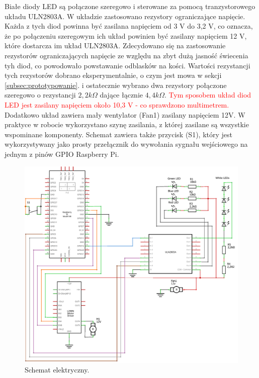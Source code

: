 Białe diody LED są połączone szeregowo i sterowane za pomocą tranzystorowego układu ULN2803A. W układzie zastosowano rezystory ograniczające napięcie. Każda z tych diod powinna być 
zasilana napięciem od 3 V do 3,2 V, co oznacza, że po połączeniu szeregowym ich układ powinien być zasilany napięciem 12 V, które dostarcza im układ ULN2803A. Zdecydowano się na zastosowanie
rezystorów ograniczających napięcie ze względu na zbyt dużą jasność świecenia tyh diod, co powodowało powstawanie odblasków na kości. Wartości rezystancji tych rezystorów dobrano eksperymentalnie, o czym jest mowa w sekcji \ref{subsec:prototypowanie}.
i ostatecznie wybrano dwa rezystory połączone szeregowo o rezystancji $2{,}2 k\Omega$ dające łącznie $4{,}4 k\Omega$. \textcolor{red}{Tym sposobem układ diod LED jest zasilany napięciem około 10,3 V - co sprawdzono multimetrem.}
Dodatkowo układ zawiera mały wentylator (Fan1) zasilany napięciem 12V. W praktyce w robocie wykorzystano szynę zasilania, z której zasilane są wszystkie wspominane komponenty. 
Schemat zawiera także przycisk (S1), który jest wykorzystywany jako prosty przełącznik do wywołania sygnału wejściowego na jednym z pinów GPIO Raspberry Pi.

\begin{figure}[H]
    \centering
    \includegraphics[width=0.95\linewidth]{chapters/03-praca-wlasna/figures/electronics circut_schem}
    \caption{\label{fig:electronics}Schemat elektryczny.}
\end{figure}